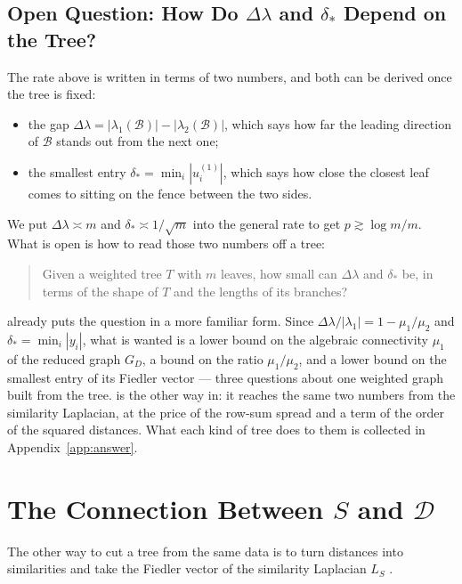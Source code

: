 \documentclass[11pt]{article}
\begin{document}
\subsection{Open Question: How Do $\Delta\lambda$ and $\delta_*$ Depend on the Tree?}
\label{sec:open}

The rate above is written in terms of two numbers, and both can be derived once the tree is
fixed:
\begin{itemize}
\item the gap $\Delta\lambda = |\lambda_1(\mathcal{B})| - |\lambda_2(\mathcal{B})|$, which
says how far the leading direction of $\mathcal{B}$ stands out from the next one;
\item the smallest entry $\delta_* = \min_i |u^{(1)}_i|$, which says how close the closest
leaf comes to sitting on the fence between the two sides.
\end{itemize}
We put $\Delta\lambda \asymp m$ and $\delta_* \asymp 1/\sqrt{m}$ into the general rate to
get $p \gtrsim \log m / m$. What is open is how to read those two numbers off a tree:

\begin{quote}
Given a weighted tree $T$ with $m$ leaves, how small can $\Delta\lambda$ and $\delta_*$
be, in terms of the shape of $T$ and the lengths of its branches?
\end{quote}

 already puts the question in a more familiar form. Since
$\Delta\lambda/|\lambda_1| = 1 - \mu_1/\mu_2$ and $\delta_* = \min_i |y_i|$, what is wanted
is a lower bound on the algebraic connectivity $\mu_1$ of the reduced graph $G_D$, a bound
on the ratio $\mu_1/\mu_2$, and a lower bound on the smallest entry of its Fiedler vector
--- three questions about one weighted graph built from the tree. 
is the other way in: it reaches the same two numbers from the similarity Laplacian, at the
price of the row-sum spread and a term of the order of the squared distances. What each kind of tree
does to them is collected in Appendix~\ref{app:answer}.

\section{The Connection Between $S$ and $\mathcal{D}$}
\label{sec:vs-laplacian}

The other way to cut a tree from the same data is to turn distances into similarities and
take the Fiedler vector of the similarity Laplacian $L_S$ \cite{fiedler1975property}.
\end{document}

